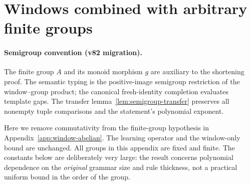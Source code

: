 \section{Windows combined with arbitrary finite groups}
\label{app:window-group}


\paragraph{Semigroup convention (v82 migration).}
The finite group $A$ and its monoid morphism $g$ are auxiliary to the
shortening proof. The semantic typing is the positive-image
semigroup restriction of the window--group product; the canonical
fresh-identity completion evaluates template gaps. The transfer
lemma~\ref{lem:semigroup-transfer} preserves all nonempty tuple
comparisons and the statement's polynomial exponent.


Here we remove commutativity from the finite-group hypothesis in
Appendix~\ref{app:window-abelian}.  The learning operator and the
window-only bound are unchanged.  All groups in this appendix are
fixed and finite.  The constants below are deliberately very large:
the result concerns polynomial dependence on the \emph{original}
grammar size and rule thickness, not a practical uniform bound in
the order of the group.

